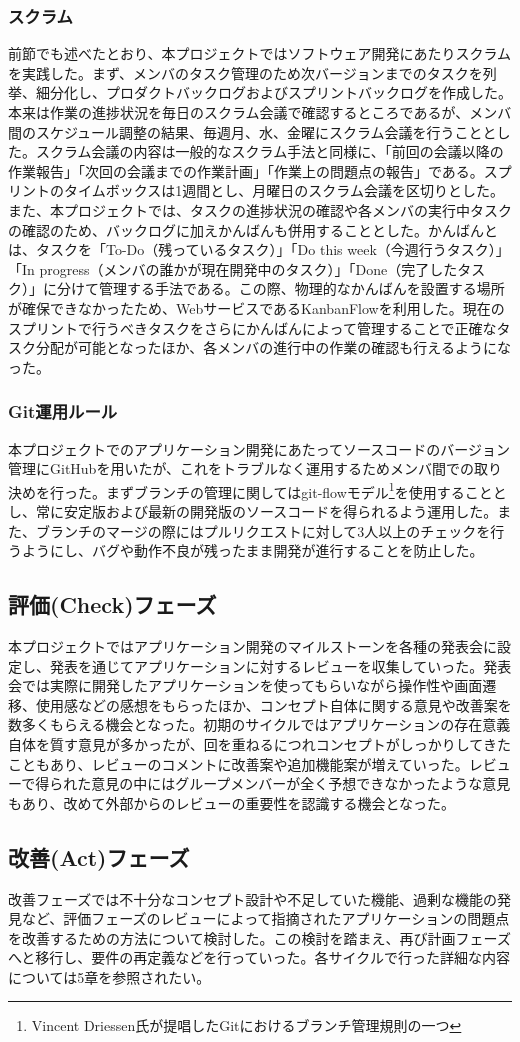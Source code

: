 \subsubsection{スクラム}
前節でも述べたとおり、本プロジェクトではソフトウェア開発にあたりスクラムを実践した。まず、メンバのタスク管理のため次バージョンまでのタスクを列挙、細分化し、プロダクトバックログおよびスプリントバックログを作成した。本来は作業の進捗状況を毎日のスクラム会議で確認するところであるが、メンバ間のスケジュール調整の結果、毎週月、水、金曜にスクラム会議を行うこととした。スクラム会議の内容は一般的なスクラム手法と同様に、「前回の会議以降の作業報告」「次回の会議までの作業計画」「作業上の問題点の報告」である。スプリントのタイムボックスは1週間とし、月曜日のスクラム会議を区切りとした。また、本プロジェクトでは、タスクの進捗状況の確認や各メンバの実行中タスクの確認のため、バックログに加えかんばんも併用することとした。かんばんとは、タスクを「To-Do（残っているタスク）」「Do this week（今週行うタスク）」「In progress（メンバの誰かが現在開発中のタスク）」「Done（完了したタスク）」に分けて管理する手法である。この際、物理的なかんばんを設置する場所が確保できなかったため、WebサービスであるKanbanFlowを利用した。現在のスプリントで行うべきタスクをさらにかんばんによって管理することで正確なタスク分配が可能となったほか、各メンバの進行中の作業の確認も行えるようになった。
\subsubsection{Git運用ルール}
本プロジェクトでのアプリケーション開発にあたってソースコードのバージョン管理にGitHubを用いたが、これをトラブルなく運用するためメンバ間での取り決めを行った。まずブランチの管理に関してはgit-flowモデル\footnote{Vincent Driessen氏が提唱したGitにおけるブランチ管理規則の一つ}を使用することとし、常に安定版および最新の開発版のソースコードを得られるよう運用した。また、ブランチのマージの際にはプルリクエストに対して3人以上のチェックを行うようにし、バグや動作不良が残ったまま開発が進行することを防止した。
\subsection{評価(Check)フェーズ}
本プロジェクトではアプリケーション開発のマイルストーンを各種の発表会に設定し、発表を通じてアプリケーションに対するレビューを収集していった。発表会では実際に開発したアプリケーションを使ってもらいながら操作性や画面遷移、使用感などの感想をもらったほか、コンセプト自体に関する意見や改善案を数多くもらえる機会となった。初期のサイクルではアプリケーションの存在意義自体を質す意見が多かったが、回を重ねるにつれコンセプトがしっかりしてきたこともあり、レビューのコメントに改善案や追加機能案が増えていった。レビューで得られた意見の中にはグループメンバーが全く予想できなかったような意見もあり、改めて外部からのレビューの重要性を認識する機会となった。
\subsection{改善(Act)フェーズ}
改善フェーズでは不十分なコンセプト設計や不足していた機能、過剰な機能の発見など、評価フェーズのレビューによって指摘されたアプリケーションの問題点を改善するための方法について検討した。この検討を踏まえ、再び計画フェーズへと移行し、要件の再定義などを行っていった。各サイクルで行った詳細な内容については5章を参照されたい。

